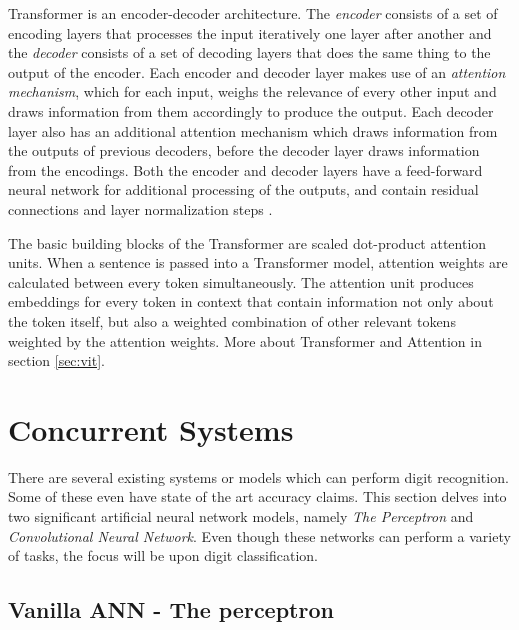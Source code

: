 \documentclass[12pt, a4paper]{report}
\begin{document}
Transformer is an encoder-decoder architecture. The \emph{encoder} consists of a set of encoding layers that processes the input iteratively one layer after another and the \emph{decoder} consists of a set of decoding layers that does the same thing to the output of the encoder. Each encoder and decoder layer makes use of an \emph{attention mechanism}, which for each input, weighs the relevance of every other input and draws information from them accordingly to produce the output. Each decoder layer also has an additional attention mechanism which draws information from the outputs of previous decoders, before the decoder layer draws information from the encodings. Both the encoder and decoder layers have a feed-forward neural network for additional processing of the outputs, and contain residual connections and layer normalization steps \cite{wiki:transformer}.

The basic building blocks of the Transformer are scaled dot-product attention units. When a sentence is passed into a Transformer model, attention weights are calculated between every token simultaneously. The attention unit produces embeddings for every token in context that contain information not only about the token itself, but also a weighted combination of other relevant tokens weighted by the attention weights. More about Transformer and Attention in section \eqref{sec:vit}.
\vspace*{\fill}

\chapter{Concurrent Systems}
\label{chap:existing}
\thispagestyle{fancy}

\hspace{0.5cm} There are several existing systems or models which can perform digit recognition. Some of these even have state of the art accuracy claims. This section delves into two significant artificial neural network models, namely \emph{The Perceptron} and \emph{Convolutional Neural Network}. Even though these networks can perform a variety of tasks, the focus will be upon digit classification.

\section{Vanilla ANN - The perceptron}
\label{sec:perceptron}
\end{document}
